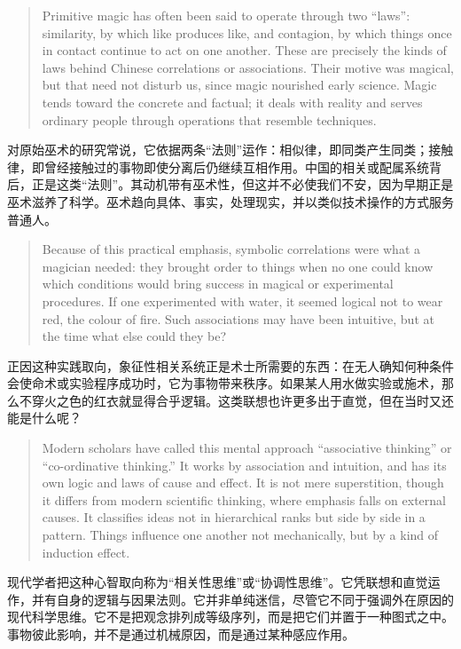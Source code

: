 \documentclass[UTF8,zihao=-4]{ctexart}
\newenvironment{enblock}
  {\par\smallskip\noindent{\scriptsize\bfseries English}\par\begin{quote}\small}
  {\end{quote}}
\newenvironment{zhblock}
  {\par\noindent{\scriptsize\bfseries 中文}\par}
  {\par\medskip}
\begin{document}
\begin{enblock}
Primitive magic has often been said to operate through two ``laws'': similarity, by which like produces like, and contagion, by which things once in contact continue to act on one another. These are precisely the kinds of laws behind Chinese correlations or associations. Their motive was magical, but that need not disturb us, since magic nourished early science. Magic tends toward the concrete and factual; it deals with reality and serves ordinary people through operations that resemble techniques.
\end{enblock}
\begin{zhblock}
对原始巫术的研究常说，它依据两条“法则”运作：相似律，即同类产生同类；接触律，即曾经接触过的事物即使分离后仍继续互相作用。中国的相关或配属系统背后，正是这类“法则”。其动机带有巫术性，但这并不必使我们不安，因为早期正是巫术滋养了科学。巫术趋向具体、事实，处理现实，并以类似技术操作的方式服务普通人。
\end{zhblock}

\begin{enblock}
Because of this practical emphasis, symbolic correlations were what a magician needed: they brought order to things when no one could know which conditions would bring success in magical or experimental procedures. If one experimented with water, it seemed logical not to wear red, the colour of fire. Such associations may have been intuitive, but at the time what else could they be?
\end{enblock}
\begin{zhblock}
正因这种实践取向，象征性相关系统正是术士所需要的东西：在无人确知何种条件会使命术或实验程序成功时，它为事物带来秩序。如果某人用水做实验或施术，那么不穿火之色的红衣就显得合乎逻辑。这类联想也许更多出于直觉，但在当时又还能是什么呢？
\end{zhblock}

\begin{enblock}
Modern scholars have called this mental approach ``associative thinking'' or ``co-ordinative thinking.'' It works by association and intuition, and has its own logic and laws of cause and effect. It is not mere superstition, though it differs from modern scientific thinking, where emphasis falls on external causes. It classifies ideas not in hierarchical ranks but side by side in a pattern. Things influence one another not mechanically, but by a kind of induction effect.
\end{enblock}
\begin{zhblock}
现代学者把这种心智取向称为“相关性思维”或“协调性思维”。它凭联想和直觉运作，并有自身的逻辑与因果法则。它并非单纯迷信，尽管它不同于强调外在原因的现代科学思维。它不是把观念排列成等级序列，而是把它们并置于一种图式之中。事物彼此影响，并不是通过机械原因，而是通过某种感应作用。
\end{zhblock}
\end{document}
